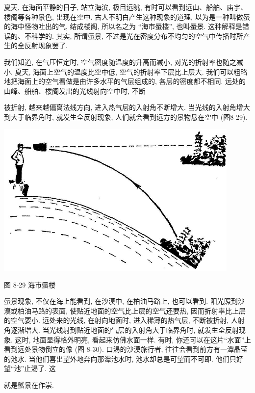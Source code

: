 \documentclass[10pt]{article}
\begin{document}
夏天, 在海面平静的日子, 站立海滨, 极目远眺, 有时可以看到远山、船舶、庙宇、楼阁等各种景色, 出现在空中. 古人不明白产生这种现象的道理, 以为是一种叫做蜃的海中怪物吐出的气, 结成楼阁, 所以名之为 “海市蜃楼”, 也叫蜃景. 这种解释是错误的、不科学的. 其实, 所谓蜃景, 不过是光在密度分布不均匀的空气中传播时所产生的全反射现象罢了.

我们知道, 在气压恒定时, 空气密度随温度的升高而减小, 对光的折射率也随之减小. 夏天, 海面上空气的温度比空中低, 空气的折射率下层比上层大. 我们可以粗略地把海面上的空气看做是由许多水平的气层组成的, 各层的密度都不相同. 远处的山峰、船舶、楼阁发出的光线射向空中时, 不断

被折射, 越来越偏离法线方向, 进入热气层的入射角不断增大. 当光线的入射角增大到大于临界角时, 就发生全反射现象, 人们就会看到远方的景物悬在空中 (图8-29).

\begin{center}
\includegraphics[max width=0.9\textwidth]{images/01913056-1f15-74d8-9184-9aab52c9d66b_268_712367.jpg}
\end{center}

图 8-29 海市蜃楼

蜃景现象, 不仅在海上能看到, 在沙漠中, 在柏油马路上, 也可以看到. 阳光照到沙漠或柏油马路的表面, 使贴近地面的空气比上层的空气还要热, 因而折射率比上层的空气要小. 远处来的光线, 在射向地面时, 进入稀薄的热气层, 不断被折射, 人射角逐渐增大. 当光线射到贴近地面的气层的入射角大于临界角时, 就发生全反射现象. 这时, 地面显得格外明亮, 看起来仿佛水面一样. 有时, 你还可以在这片“水面”上看到远处景物倒立的像 (图 8-30). 口渴的沙漠旅行者, 往往会看到前方有一潭晶莹的池水. 当他们喜出望外地奔向那潭池水时, 池水却总是可望而不可即. 他们只好望“池”止渴了. 这

就是蟹景在作崇.
\end{document}
